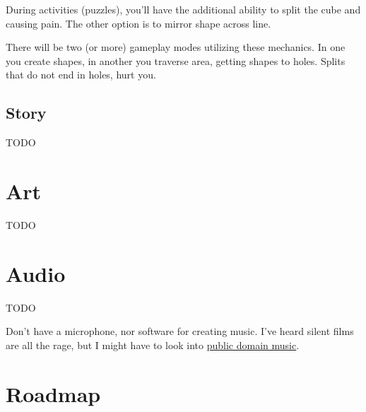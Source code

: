\documentclass[12pt, letterpaper]{article}
\begin{document}
During activities (puzzles), you'll have the additional ability to split the
cube and causing pain. The other option is to mirror shape across line.

There will be two (or more) gameplay modes utilizing these mechanics. In one
you create shapes, in another you traverse area, getting shapes to holes. Splits
that do not end in holes, hurt you.

\subsection{Story}

TODO

\section{Art}

TODO


\section{Audio}

TODO

Don't have a microphone, nor software for creating music.
I've heard silent films are all the rage, but I might have to look into
\href{https://blog.archive.org/2022/01/01/welcoming-recorded-music-to-the-public-domain/}{public domain music}.

\section{Roadmap}
\end{document}
